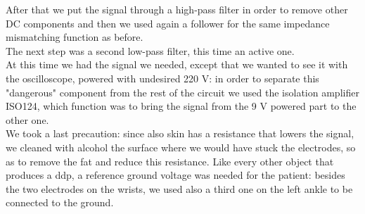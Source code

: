 After that we put the signal through a high-pass filter in order to remove other DC components and then we used again a follower for the same impedance mismatching function as before.\\
The next step was a second low-pass filter, this time an active one.\\
At this time we had the signal we needed, except that we wanted to see it with the oscilloscope, powered with undesired 220 V: in order to separate this "dangerous" component from the rest of the circuit we used the isolation amplifier ISO124, which function was to bring the signal from the 9 V powered part to the other one.\\
We took a last precaution: since also skin has a resistance that lowers the signal, we cleaned with alcohol the surface where we would have stuck the electrodes, so as to remove the fat and reduce this resistance.
Like every other object that produces a ddp, a reference ground voltage was needed for the patient: besides the two electrodes on the wrists, we used also a third one on the left ankle to be connected to the ground.

